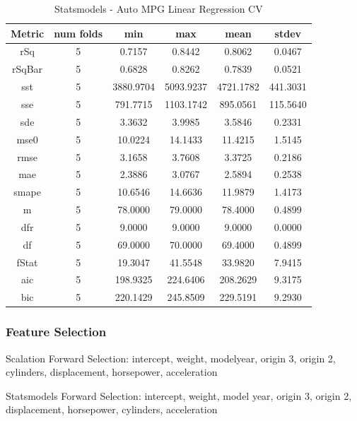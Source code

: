 \documentclass{article}
\begin{document}
\begin{table}[H]
\centering
\caption{Statsmodels - Auto MPG Linear Regression CV}
\label{tab:Statsmodels - Auto MPG Linear Regression CV}
\begin{tabular}{|c|c|c|c|c|c|}\hline
Metric & num folds & min & max & mean & stdev \\ \hline \hline
rSq & 5 & 0.7157 & 0.8442 & 0.8062 & 0.0467 \\ \hline
rSqBar & 5 & 0.6828 & 0.8262 & 0.7839 & 0.0521 \\ \hline
sst & 5 & 3880.9704 & 5093.9237 & 4721.1782 & 441.3031 \\ \hline
sse & 5 & 791.7715 & 1103.1742 & 895.0561 & 115.5640 \\ \hline
sde & 5 & 3.3632 & 3.9985 & 3.5846 & 0.2331 \\ \hline
mse0 & 5 & 10.0224 & 14.1433 & 11.4215 & 1.5145 \\ \hline
rmse & 5 & 3.1658 & 3.7608 & 3.3725 & 0.2186 \\ \hline
mae & 5 & 2.3886 & 3.0767 & 2.5894 & 0.2538 \\ \hline
smape & 5 & 10.6546 & 14.6636 & 11.9879 & 1.4173 \\ \hline
m & 5 & 78.0000 & 79.0000 & 78.4000 & 0.4899 \\ \hline
dfr & 5 & 9.0000 & 9.0000 & 9.0000 & 0.0000 \\ \hline
df & 5 & 69.0000 & 70.0000 & 69.4000 & 0.4899 \\ \hline
fStat & 5 & 19.3047 & 41.5548 & 33.9820 & 7.9415 \\ \hline
aic & 5 & 198.9325 & 224.6406 & 208.2629 & 9.3175 \\ \hline
bic & 5 & 220.1429 & 245.8509 & 229.5191 & 9.2930 \\ \hline
\end{tabular}
\end{table}

\subsubsection{Feature Selection}

Scalation Forward Selection: intercept, weight, modelyear, origin 3, origin 2, cylinders, displacement, horsepower, acceleration

Statsmodels Forward Selection: intercept, weight, model year, origin 3, origin 2, displacement, horsepower, cylinders, acceleration
\end{document}
